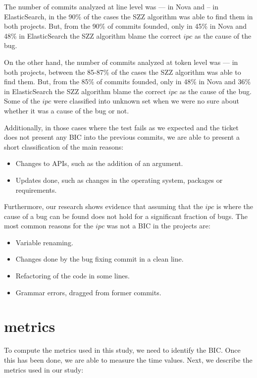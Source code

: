 \documentclass[10pt, conference]{IEEEtran}
\begin{document}
The number of commits analyzed at line level was --- in Nova and -- in ElasticSearch, in the 90\% of the cases the SZZ algorithm was able to find them in both projects. But, from the 90\% of commits founded, only in 45\% in Nova and 48\% in ElasticSearch the SZZ algorithm blame the correct $ipc$ as the cause of the bug.

On the other hand, the number of commits analyzed at token level was --- in both projects, between the 85-87\% of the cases the SZZ algorithm was able to find them. But, from the 85\% of commits founded, only in 48\% in Nova and 36\% in ElasticSearch the SZZ algorithm blame the correct $ipc$ as the cause of the bug. Some of the $ipc$ were classified into unknown set when we were no sure about whether it was a cause of the bug or not.

Additionally, in those cases where the test fails as we expected and the ticket does not present any BIC into the previous commits, we are able to present a short classification of the main reasons:
\begin{itemize}
  \item Changes to APIs, such as the addition of an argument. 
  \item Updates done, such as changes in the operating system, packages or requirements.
\end{itemize}

Furthermore, our research shows evidence that assuming that the $ipc$ is where the cause of a bug can be found does not hold for a significant fraction of bugs. The most common reasons for the $ipc$ was not a BIC in the projects are:

\begin{itemize}
  \item Variable renaming.
  \item Changes done by the bug fixing commit in a clean line.
  \item Refactoring of the code in some lines.
  \item Grammar errors, dragged from former commits.
\end{itemize} 

\section{metrics}
\label{sec:metrics}

To compute the metrics used in this study, we need to identify the BIC. Once this has been done, we are able to measure the time values. Next, we describe the metrics used in our study: 
\end{document}
